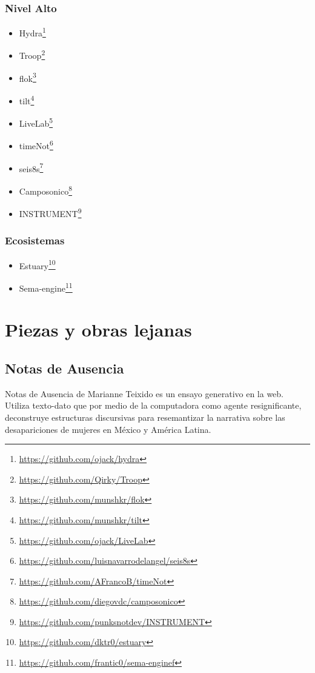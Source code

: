 \subsubsection{Nivel Alto}

\begin{itemize}
\item Hydra\footnote{\url{https://github.com/ojack/hydra}}
\item Troop\footnote{\url{https://github.com/Qirky/Troop}}
\item flok\footnote{\url{https://github.com/munshkr/flok}}
\item tilt\footnote{\url{https://github.com/munshkr/tilt}}
\item LiveLab\footnote{\url{https://github.com/ojack/LiveLab}}
\item timeNot\footnote{\url{https://github.com/luisnavarrodelangel/seis8s}}
\item seis8s\footnote{\url{https://github.com/AFrancoB/timeNot}}
\item Camposonico\footnote{\url{https://github.com/diegovdc/camposonico}}
\item INSTRUMENT\footnote{\url{https://github.com/punksnotdev/INSTRUMENT}}
\end{itemize}


\subsubsection{Ecosistemas}

\begin{itemize}
\item Estuary\footnote{\url{https://github.com/dktr0/estuary}}
\item Sema-engine\footnote{\url{https://github.com/frantic0/sema-enginef}}
\end{itemize}

\section{Piezas y obras lejanas}

\subsection{Notas de Ausencia} %

Notas de Ausencia de Marianne Teixido  es un ensayo generativo en la web. Utiliza texto-dato que por medio de la computadora como agente resignificante, deconstruye estructuras discursivas para resemantizar la narrativa sobre las desapariciones de mujeres en México y América Latina.

